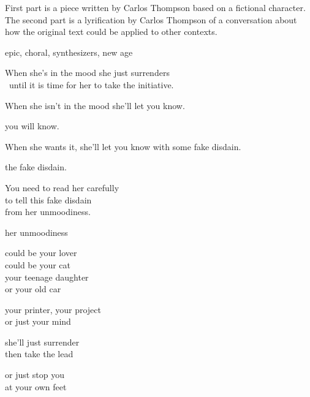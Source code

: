 

\begin{notes}
First part is a piece written by Carlos Thompson based on a fictional character. %
The second part is a lyrification by Carlos Thompson of a conversation about how the original text could be applied to other contexts.
\end{notes}

\begin{style}
epic, choral, synthesizers, new age
\end{style}

\begin{lyrics}
When she's in the mood she just surrenders\\
 until it is time for her to take the initiative.

When she isn't in the mood she'll let you know.

you will know. 

When she wants it, she'll let you know with some fake disdain.

the fake disdain.

You need to read her carefully\\
to tell this fake disdain\\
from her unmoodiness.

her unmoodiness

could be your lover\\
could be your cat\\
your teenage daughter\\
or your old car

your printer, your project\\
or just your mind

she'll just surrender\\
then take the lead

or just stop you\\
at your own feet

\end{lyrics}

